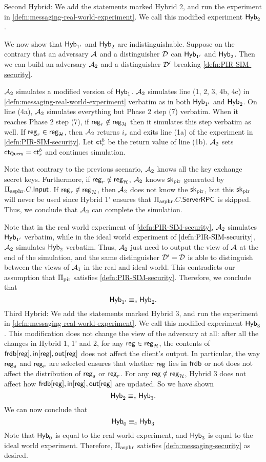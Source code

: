 Second Hybrid: We add the statements marked Hybrid 2, and run the experiment in \cref{defn:messaging-real-world-experiment}. We call this modified experiment $\mathsf{Hyb}_{2}$.

We now show that $\mathsf{Hyb}_{1'}$ and $\mathsf{Hyb}_{2}$ are indistinguishable. Suppose on the contrary that an adversary $\mathcal{A}$ and a distinguisher $\mathcal{D}$ can $\mathsf{Hyb}_{1'}$ and $\mathsf{Hyb}_{2}$. Then we can build an adversary $\mathcal{A}_2$ and a distinguisher $\mathcal{D}'$ breaking \cref{defn:PIR-SIM-security}. 

$\mathcal{A}_2$ simulates a modified version of $\mathsf{Hyb}_1$. $\mathcal{A}_2$ simulates line (1, 2, 3, 4b, 4c) in \cref{defn:messaging-real-world-experiment} verbatim as in both $\mathsf{Hyb}_{1'}$ and $\mathsf{Hyb}_2$. On line (4a), $\mathcal{A}_2$ simulates everything but Phase 2 step (7) verbatim. When it reaches Phase 2 step (7), if $\mathsf{reg}_r \notin \mathsf{reg}_{\mathcal{H}}$ then it simulates this step verbatim as well. If $\mathsf{reg}_r \in \mathsf{reg}_{\mathcal{H}}$, then $\mathcal{A}_2$ returns $i_r$ and exits line (1a) of the experiment in \cref{defn:PIR-SIM-security}. Let $\mathsf{ct}^b_r$ be the return value of line (1b). $\mathcal{A}_2$ sets $\mathsf{ct}_{\mathsf{Query}} = \mathsf{ct}^b_r$ and continues simulation.

Note that contrary to the previous scenario, $\mathcal{A}_2$ knows all the key exchange secret keys. Furthermore, if $\mathsf{reg}_r \notin \mathsf{reg}_{\mathcal{H}}$, $\mathcal{A}_2$ knows ${\mathsf{sk}}_{\text{pir}}$ generated by $\Pi_{\text{asphr}}.C.\mathsf{Input}$. If $\mathsf{reg}_r \notin \mathsf{reg}_{\mathcal{H}}$, then $\mathcal{A}_2$ does not know the ${\mathsf{sk}}_{\text{pir}}$, but this ${\mathsf{sk}}_{\text{pir}}$ will never be used since Hybrid 1' ensures that $\Pi_{\text{asphr}}.C.\mathsf{ServerRPC}$ is skipped. Thus, we conclude that $\mathcal{A}_2$ can complete the simulation.

Note that in the real world experiment of \cref{defn:PIR-SIM-security}, $\mathcal{A}_2$ simulates $\mathsf{Hyb}_{1'}$ verbatim, while in the ideal world experiment of $\cref{defn:PIR-SIM-security}$, $\mathcal{A}_2$ simulates $\mathsf{Hyb}_2$ verbatim. Thus, $\mathcal{A}_2$ just need to output the view of $\mathcal{A}$ at the end of the simulation, and the same distinguisher $\mathcal{D}' = \mathcal{D}$ is able to distinguish between the views of $\mathcal{A}_1$ in the real and ideal world. This contradicts our assumption that $\Pi_{\text{pir}}$ satisfies \cref{defn:PIR-SIM-security}. Therefore, we conclude that
$$\mathsf{Hyb}_{1'} \equiv_c \mathsf{Hyb}_2.$$
Third Hybrid: We add the statements marked Hybrid 3, and run the experiment in \cref{defn:messaging-real-world-experiment}. We call this modified experiment $\mathsf{Hyb}_{3}$. This modification does not change the view of the adversary at all: after all the changes in Hybrid 1, 1' and 2, for any $\mathsf{reg} \in \mathsf{reg}_{\mathcal{H}}$, the contents of $\mathsf{frdb}[\mathsf{reg}], \mathsf{in}[\mathsf{reg}], \mathsf{out}[\mathsf{reg}]$ does not affect the client's output. In particular, the way $\mathsf{reg}_s$ and $\mathsf{reg}_r$ are selected ensures that whether $\mathsf{reg}$ lies in $\mathsf{frdb}$ or not does not affect the distribution of $\mathsf{reg}_s$ or $\mathsf{reg}_r$. For any $\mathsf{reg} \notin \mathsf{reg}_{\mathcal{H}}$, Hybrid 3 does not affect how $\mathsf{frdb}[\mathsf{reg}], \mathsf{in}[\mathsf{reg}], \mathsf{out}[\mathsf{reg}]$ are updated. So we have shown
$$\mathsf{Hyb}_{2} \equiv_c \mathsf{Hyb}_3.$$
We can now conclude that
$$\mathsf{Hyb}_0 \equiv_c \mathsf{Hyb}_3$$
Note that $\mathsf{Hyb}_0$ is equal to the real world experiment, and $\mathsf{Hyb}_3$ is equal to the ideal world experiment. Therefore, $\Pi_{\text{asphr}}$ satisfies \cref{defn:messaging-security} as desired. 


